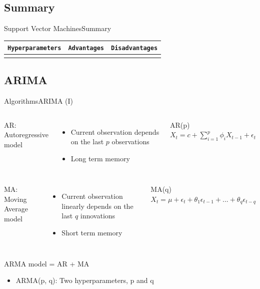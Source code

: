 \documentclass[10pt,compress]{beamer} %
\begin{document}
\subsection{Summary}
\begin{frame}{Support Vector Machines}{Summary}
	\begin{center}
	\begin{tabular}{cp{3cm}p{3cm}}\hline
	 	\texttt{Hyperparameters}  & \texttt{Advantages}  & \texttt{Disadvantages} \\\hline
	 	                          &                               &   \\
	 	\hline
	\end{tabular}
	\end{center}
\end{frame}




\subsection{ARIMA}
\begin{frame}{Algorithms}{ARIMA (I)}
    \begin{columns}
	   AR: Autoregressive model
	    \begin{itemize}
		\item Current observation depends on the last $p$ observations
		\item Long term memory
	    \end{itemize}

		\begin{block}{AR(p)}
			$X_t = c+\sum_{i=1}^p \phi_i X_{t-1}+\epsilon_t$
        	\end{block}
    \end{columns}

    \smallskip

    \begin{columns}
	   MA: Moving Average model
	    \begin{itemize}
		\item Current observation linearly depends on the last $q$ innovations
		\item Short term memory
	    \end{itemize}

		\begin{block}{MA(q)}
			$X_t =  \mu + \epsilon_t + \theta_1 \epsilon_{t-1} + ... + \theta_q \epsilon_{t-q}$
        	\end{block}
    \end{columns}

    \bigskip

    ARMA model = AR + MA
	\begin{itemize}
		\item ARMA(p, q): Two hyperparameters, p and q
	\end{itemize}

\end{frame}
\end{document}
